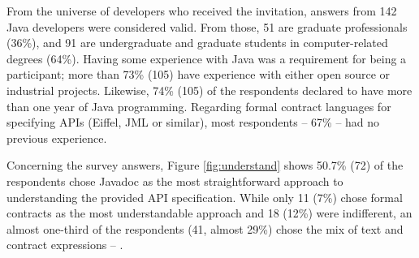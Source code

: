 From the universe of developers who received the invitation, answers from 142 Java developers were considered valid.
From those, 51 are graduate professionals (36\%), and 91 are undergraduate and graduate students in computer-related degrees (64\%).
Having some experience with Java was a requirement for being a participant; more than 73\% (105) have experience with either open source or industrial projects. Likewise, 74\% (105) of the respondents declared to have more than one year of Java programming.
Regarding formal contract languages for specifying APIs (Eiffel, JML or similar), most respondents -- 67\% -- had no previous experience. 


Concerning the survey answers, Figure \ref{fig:understand} shows 50.7\% (72) of the respondents chose Javadoc as the most straightforward approach to understanding the provided API specification. 
While only 11 (7\%) chose formal contracts as the most understandable approach and 18 (12\%) were indifferent, an almost one-third of the respondents (41, almost 29\%) chose the mix of text and contract expressions -- \contractjdoc{}.


